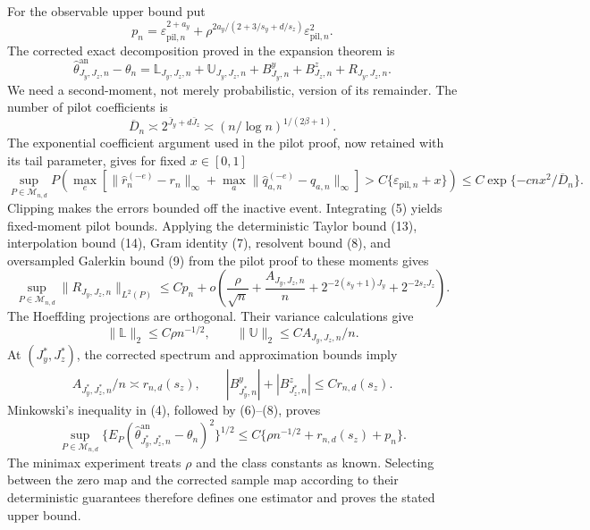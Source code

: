 For the observable upper bound put
\[
p_n=\varepsilon_{\mathrm{pil},n}^{2+a_y}+
\rho^{2a_y/(2+3/s_y+d/s_z)}\varepsilon_{\mathrm{pil},n}^2.
\]
The corrected exact decomposition proved in the expansion theorem is
\[
\widehat\theta^{\mathrm{an}}_{J_y,J_z,n}-\theta_n
=\mathbb L_{J_y,J_z,n}+\mathbb U_{J_y,J_z,n}
+B^y_{J_y,n}+B^z_{J_z,n}+R_{J_y,J_z,n}.                                  \tag{4}
\]
We need a second-moment, not merely probabilistic, version of its remainder.  The number of pilot coefficients is
\[
\overline D_n\asymp2^{\bar J_y+d\bar J_z}
\asymp(n/\log n)^{1/(2\beta+1)}.
\]
The exponential coefficient argument used in the pilot proof, now retained with its tail parameter, gives for fixed \(x\in[0,1]\)
\[
\sup_{P\in\mathcal M_{n,d}}
P\!\left(\max_e[\|\widehat r_n^{(-e)}-r_n\|_\infty+
\max_a\|\widehat q_{a,n}^{(-e)}-q_{a,n}\|_\infty]
>C\{\varepsilon_{\mathrm{pil},n}+x\}\right)
\le C\exp\{-cnx^2/\overline D_n\}.                                     \tag{5}
\]
Clipping makes the errors bounded off the inactive event.  Integrating (5) yields fixed-moment pilot bounds.  Applying the deterministic Taylor bound (13), interpolation bound (14), Gram identity (7), resolvent bound (8), and oversampled Galerkin bound (9) from the pilot proof to these moments gives
\[
\sup_{P\in\mathcal M_{n,d}}\|R_{J_y,J_z,n}\|_{L^2(P)}
\le Cp_n+o\!\left(\frac\rho{\sqrt n}+\frac{A_{J_y,J_z,n}}n+
2^{-2(s_y+1)J_y}+2^{-2s_zJ_z}\right).                                   \tag{6}
\]
The Hoeffding projections are orthogonal.  Their variance calculations give
\[
\|\mathbb L\|_2\le C\rho n^{-1/2},
\qquad
\|\mathbb U\|_2\le CA_{J_y,J_z,n}/n.                                  \tag{7}
\]
At \((J_y^*,J_z^*)\), the corrected spectrum and approximation bounds imply
\[
A_{J_y^*,J_z^*,n}/n\asymp r_{n,d}(s_z),
\qquad
|B^y_{J_y^*,n}|+|B^z_{J_z^*,n}|\le Cr_{n,d}(s_z).                        \tag{8}
\]
Minkowski's inequality in (4), followed by (6)--(8), proves
\[
\sup_{P\in\mathcal M_{n,d}}
\{E_P(\widehat\theta^{\mathrm{an}}_{J_y^*,J_z^*,n}-\theta_n)^2\}^{1/2}
\le C\{\rho n^{-1/2}+r_{n,d}(s_z)+p_n\}.                               \tag{9}
\]
The minimax experiment treats \(\rho\) and the class constants as known.  Selecting between the zero map and the corrected sample map according to their deterministic guarantees therefore defines one estimator and proves the stated upper bound.


